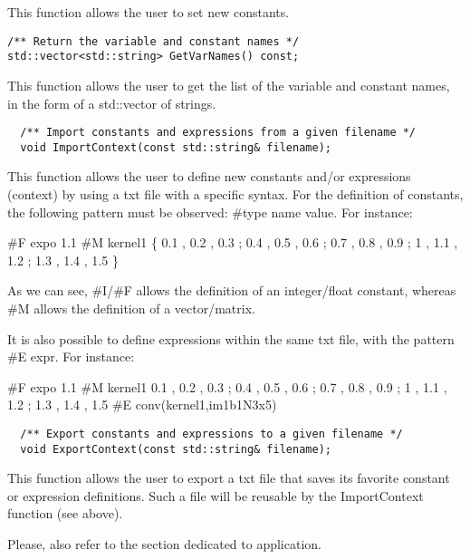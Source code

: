 This function allows the user to set new constants.


\begin{verbatim}
/** Return the variable and constant names */
std::vector<std::string> GetVarNames() const;
\end{verbatim}

This function allows the user to get the list of the variable and constant names, in the form of a std::vector of strings.

\begin{verbatim}
  /** Import constants and expressions from a given filename */
  void ImportContext(const std::string& filename);
\end{verbatim}

This function allows the user to define new constants and/or expressions (context) by using a txt file with a specific syntax.
For the definition of constants, the following pattern must be observed:
\newline  \#type name value. 
\newline For instance:


\#F expo 1.1 \newline 
\#M kernel1 \{ 0.1 , 0.2 , 0.3 ; 0.4 , 0.5 , 0.6 ; 0.7 , 0.8 , 0.9 ; 1 , 1.1 , 1.2 ; 1.3 , 1.4 , 1.5 \} \newline


As we can see,  \#I/\#F allows the definition of an integer/float constant, whereas \#M allows the definition of a vector/matrix. 

It is also possible to define expressions within the same txt file, with the pattern \#E expr. For instance:


\#F expo 1.1 \newline 
\#M kernel1 { 0.1 , 0.2 , 0.3 ; 0.4 , 0.5 , 0.6 ; 0.7 , 0.8 , 0.9 ; 1 , 1.1 , 1.2 ; 1.3 , 1.4 , 1.5 } \newline 
\#E conv(kernel1,im1b1N3x5) \newline

\begin{verbatim}
  /** Export constants and expressions to a given filename */
  void ExportContext(const std::string& filename);
\end{verbatim}

This function allows the user to export a txt file that saves its favorite constant or expression definitions. Such a file will be reusable by the ImportContext function (see above).


\newline 
\newline 
Please, also refer to the section dedicated to  application.



